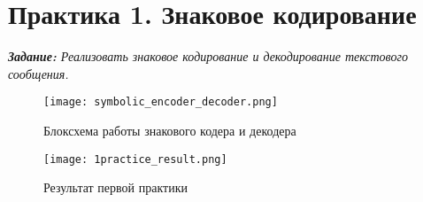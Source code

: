 \chapter*{Практика 1. Знаковое кодирование}
\label{ch:1_practice}
\label{sec:fig}
    

{ \itshape
    \textbf{Задание:} Реализовать знаковое кодирование и декодирование текстового сообщения.
}    
\begin{figure}[ht]
    \centering
    \texttt{[image: symbolic\_encoder\_decoder.png]}
    \caption{Блоксхема работы знакового кодера и декодера}
    \label{fig:symbolic_encoder_decoder.png}
\end{figure}

{
    \textbf{}

}
\begin{figure}[ht]
    \centering
    \texttt{[image: 1practice\_result.png]}
    \caption{Результат первой практики}
    \label{fig:1practice_result.png}
\end{figure}

\endinput